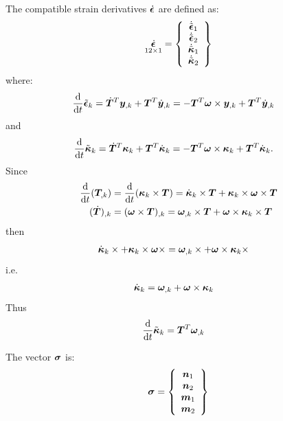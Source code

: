 The compatible strain derivatives $\dot{\T{\epsilon}}$ are defined as:
\begin{equation}
\underset{ 12 \times 1 }{
 \dot{\T{\epsilon}}
 } =
\cubr{\vvect{c}{
 \dot{\tilde{\T{\epsilon}}}_1 \\
 \dot{\tilde{\T{\epsilon}}}_2 \\
 \dot{\tilde{\T{\kappa}}}_1 \\
 \dot{\tilde{\T{\kappa}}}_2 \\
}}
\end{equation}
where:
\begin{align}
	\frac{\mathrm{d}}{\mathrm{d}t} \tilde{\T{\epsilon}}_k
	&=
	\dot{\TT{T}}^T \T{y}_{,k}
	+
	\TT{T}^T \dot{\T{y}}_{,k}
	=
	-\TT{T}^T \T{\omega} \times \T{y}_{,k}
	+
	\TT{T}^T \dot{\T{y}}_{,k}
\end{align}
and
\begin{align}
	\frac{\mathrm{d}}{\mathrm{d}t} \tilde{\T{\kappa}}_k
	&=
	\dot{\TT{T}}^T \T{\kappa}_k
	+
	\TT{T}^T \dot{\T{\kappa}}_k
	=
	-\TT{T}^T \T{\omega} \times \T{\kappa}_k
	+
	\TT{T}^T \dot{\T{\kappa}}_k
	.
\end{align}
Since
\begin{align}
	\frac{\mathrm{d}}{\mathrm{d}t} (\TT{T}_{,k})
	&=
	\frac{\mathrm{d}}{\mathrm{d}t} (\T{\kappa}_k \times \TT{T})
	=
	\dot{\T{\kappa}}_k \times \TT{T}
	+
	\T{\kappa}_k \times \T{\omega} \times \TT{T}
	\\
	(\dot{\TT{T}})_{,k}
	&=
	(\T{\omega} \times \TT{T})_{,k}
	=
	\T{\omega}_{,k} \times \TT{T}
	+
	\T{\omega} \times \T{\kappa}_k \times \TT{T}
\end{align}
then
\begin{align}
	\dot{\T{\kappa}}_k \times + \T{\kappa}_k \times \T{\omega} \times 
	&=
	\T{\omega}_{,k} \times + \T{\omega} \times \T{\kappa}_k \times
\end{align}
i.e.\
\begin{align}
	\dot{\T{\kappa}}_k
	&=
	\T{\omega}_{,k}
	+
	\T{\omega} \times \T{\kappa}_k
\end{align}
Thus
\begin{align}
	\frac{\mathrm{d}}{\mathrm{d}t} \tilde{\T{\kappa}}_k
	&=
	\TT{T}^T \T{\omega}_{,k}
\end{align}

The vector $\T{\sigma}$ is:
\begin{equation}
 \T{\sigma} =
\cubr{\vvect{c}{
 \T{n}_1 \\
 \T{n}_2 \\
 \T{m}_1 \\
 \T{m}_2 \\
}}
\end{equation}
